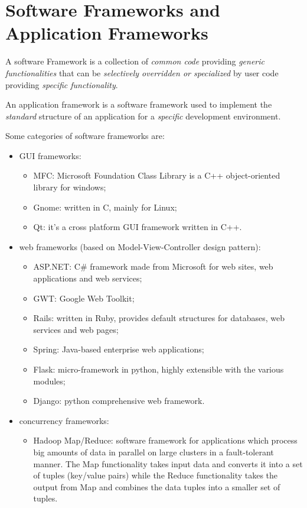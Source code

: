 \section{Software Frameworks and Application Frameworks}
A software Framework is a collection of \emph{common code} providing \emph{generic functionalities} that can be \emph{selectively overridden or specialized} by user code providing \emph{specific functionality}.

An application framework is a software framework used to implement the \emph{standard} structure of an application for a \emph{specific} development environment.

Some categories of software frameworks are:
\begin{itemize}
    \item GUI frameworks:
    \begin{itemize}
        \item MFC: Microsoft Foundation Class Library is a C++ object-oriented library for windows;
        \item Gnome: written in C, mainly for Linux;
        \item Qt: it's a cross platform GUI framework written in C++.
    \end{itemize}
    \item web frameworks (based on Model-View-Controller design pattern):
    \begin{itemize}
        \item ASP.NET: C\# framework made from Microsoft for web sites, web applications and web services;
        \item GWT: Google Web Toolkit;
        \item Rails: written in Ruby, provides default structures for databases, web services and web pages;
        \item Spring: Java-based enterprise web applications;
        \item Flask: micro-framework in python, highly extensible with the various modules;
        \item Django: python comprehensive web framework.
    \end{itemize}
    \item concurrency frameworks:
    \begin{itemize}
        \item Hadoop Map/Reduce: software framework for applications which process big amounts of data in parallel on large clusters in a fault-tolerant manner.
        The Map functionality takes input data and converts it into a set of tuples (key/value pairs) while the Reduce functionality takes the output from Map and combines the data tuples into a smaller set of tuples.
    \end{itemize}
\end{itemize}

